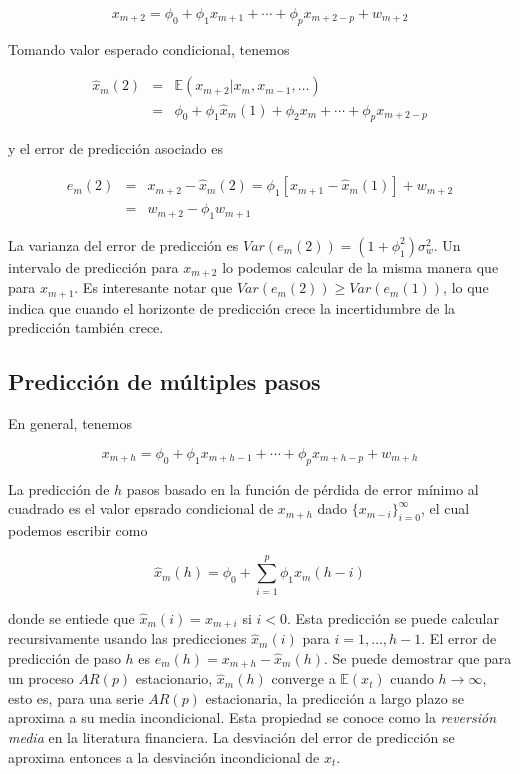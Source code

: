 \documentclass[12pt,]{krantz}
\theoremstyle{definition}
\theoremstyle{definition}
\theoremstyle{definition}
\theoremstyle{remark}
\begin{document}
\[x_{m+2} = \phi_0+\phi_1x_{m+1}+\cdots+\phi_px_{m+2-p}+w_{m+2}\]

Tomando valor esperado condicional, tenemos

\begin{eqnarray*}
\hat{x}_m(2) &=& \mathbb{E}(x_{m+2}|x_m,x_{m-1},\ldots) \\
      &=& \phi_0+\phi_1\hat{x}_m(1)+\phi_2x_m+\cdots+\phi_px_{m+2-p}
\end{eqnarray*}

y el error de predicción asociado es

\begin{eqnarray*}
e_m(2) &=& x_{m+2}-\hat{x}_m(2) = \phi_1[x_{m+1}-\hat{x}_m(1)]+w_{m+2} \\
       &=& w_{m+2}-\phi_1w_{m+1}
\end{eqnarray*}

La varianza del error de predicción es
\(Var(e_m(2))=(1+\phi_1^2)\sigma_w^2\). Un intervalo de predicción para
\(x_{m+2}\) lo podemos calcular de la misma manera que para \(x_{m+1}\).
Es interesante notar que \(Var(e_m(2))\geq Var(e_m(1))\), lo que indica
que cuando el horizonte de predicción crece la incertidumbre de la
predicción también crece.

\subsection{Predicción de múltiples
pasos}\label{prediccion-de-multiples-pasos}

En general, tenemos

\[x_{m+h}=\phi_0+\phi_1x_{m+h-1}+\cdots+\phi_px_{m+h-p}+w_{m+h}\]

La predicción de \(h\) pasos basado en la función de pérdida de error
mínimo al cuadrado es el valor epsrado condicional de \(x_{m+h}\) dado
\(\{x_{m-i}\}_{i=0}^{\infty}\), el cual podemos escribir como

\[\hat{x}_m(h) = \phi_0+\sum_{i=1}^p\phi_1\hat{x}_m(h-i)\]

donde se entiede que \(\hat{x}_m(i)=x_{m+i}\) si \(i<0\). Esta
predicción se puede calcular recursivamente usando las predicciones
\(\hat{x}_m(i)\) para \(i=1,\ldots,h-1\). El error de predicción de paso
\(h\) es \(e_m(h)=x_{m+h}-\hat{x}_m(h)\). Se puede demostrar que para un
proceso \(AR(p)\) estacionario, \(\hat{x}_m(h)\) converge a
\(\mathbb{E}(x_t)\) cuando \(h\to\infty\), esto es, para una serie
\(AR(p)\) estacionaria, la predicción a largo plazo se aproxima a su
media incondicional. Esta propiedad se conoce como la \emph{reversión
media} en la literatura financiera. La desviación del error de
predicción se aproxima entonces a la desviación incondicional de
\(x_t\).
\end{document}
